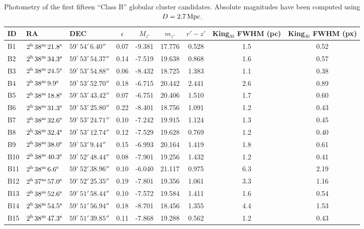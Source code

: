 \documentclass[useAMS,usenatbib]{mn2e}
\begin{document}
\begin{table}
 \centering
  \caption{Photometry of the first fifteen ``Class B'' globular cluster candidates. Absolute magnitudes have been computed using $D = 2.7\,\rm{Mpc}$.}
\label{tab:class_b}  
\begin{tabular}{lllcccccc}
	\hline
	ID & RA & DEC & $\epsilon$ & $M_{z'}$ & $m_{z'}$ & $r'-z'$ & King$_{30}$ FWHM (pc) & King$_{30}$ FWHM (px) \\
	\hline
	B1 & $2^{\rm{h}}\,38^{\rm{m}}\,21.8^{\rm{s}}$ & $59^\circ\,54'\,6.40''$ & 0.07 & -9.381 & 17.776 & 0.528 & 1.5 & 0.52 \\
	B2 & $2^{\rm{h}}\,38^{\rm{m}}\,34.3^{\rm{s}}$ & $59^\circ\,53'\,54.37''$ & 0.14 & -7.519 & 19.638 & 0.868 & 1.6 & 0.57 \\
	B3 & $2^{\rm{h}}\,38^{\rm{m}}\,24.5^{\rm{s}}$ & $59^\circ\,53'\,54.88''$ & 0.06 & -8.432 & 18.725 & 1.383 & 1.1 & 0.38 \\
	B4 & $2^{\rm{h}}\,38^{\rm{m}}\,9.9^{\rm{s}}$ & $59^\circ\,53'\,52.70''$ & 0.18 & -6.715 & 20.442 & 2.441 & 2.6 & 0.89 \\
	B5 & $2^{\rm{h}}\,38^{\rm{m}}\,18.8^{\rm{s}}$ & $59^\circ\,53'\,43.42''$ & 0.07 & -6.751 & 20.406 & 1.510 & 1.7 & 0.60 \\
	B6 & $2^{\rm{h}}\,38^{\rm{m}}\,31.3^{\rm{s}}$ & $59^\circ\,53'\,25.80''$ & 0.22 & -8.401 & 18.756 & 1.091 & 1.2 & 0.43 \\
	B7 & $2^{\rm{h}}\,38^{\rm{m}}\,32.6^{\rm{s}}$ & $59^\circ\,53'\,24.71''$ & 0.10 & -7.242 & 19.915 & 1.124 & 1.3 & 0.45 \\
	B8 & $2^{\rm{h}}\,38^{\rm{m}}\,32.4^{\rm{s}}$ & $59^\circ\,53'\,12.74''$ & 0.12 & -7.529 & 19.628 & 0.769 & 1.2 & 0.40 \\
	B9 & $2^{\rm{h}}\,38^{\rm{m}}\,38.0^{\rm{s}}$ & $59^\circ\,53'\,9.44''$ & 0.15 & -6.993 & 20.164 & 1.419 & 1.8 & 0.61 \\
	B10 & $2^{\rm{h}}\,38^{\rm{m}}\,40.3^{\rm{s}}$ & $59^\circ\,52'\,48.44''$ & 0.08 & -7.901 & 19.256 & 1.432 & 1.2 & 0.41 \\
	B11 & $2^{\rm{h}}\,38^{\rm{m}}\,6.6^{\rm{s}}$ & $59^\circ\,52'\,38.96''$ & 0.10 & -6.040 & 21.117 & 0.975 & 6.3 & 2.19 \\
	B12 & $2^{\rm{h}}\,37^{\rm{m}}\,57.0^{\rm{s}}$ & $59^\circ\,52'\,25.35''$ & 0.19 & -7.801 & 19.356 & 1.061 & 3.3 & 1.16 \\
	B13 & $2^{\rm{h}}\,38^{\rm{m}}\,52.6^{\rm{s}}$ & $59^\circ\,51'\,58.44''$ & 0.10 & -7.572 & 19.584 & 1.411 & 1.6 & 0.54 \\
	B14 & $2^{\rm{h}}\,38^{\rm{m}}\,54.5^{\rm{s}}$ & $59^\circ\,51'\,56.94''$ & 0.18 & -8.701 & 18.456 & 1.355 & 4.4 & 1.53 \\
	B15 & $2^{\rm{h}}\,38^{\rm{m}}\,47.3^{\rm{s}}$ & $59^\circ\,51'\,39.85''$ & 0.11 & -7.868 & 19.288 & 0.562 & 1.2 & 0.43 \\
	\hline
\end{tabular}
\end{table}



\label{lastpage}
\end{document}

